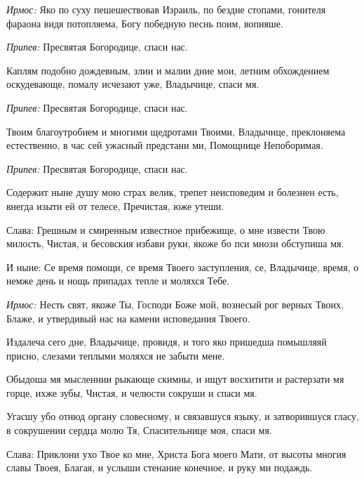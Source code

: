 \begin{mymulticols}
 




{\itshape Ирмос:} Яко по суху пешешествовав Израиль, по бездне стопами, гонителя фараона видя потопляема, Богу победную песнь поим, вопияше. 

{\itshape Припев:} Пресвятая Богородице, спаси нас. 

Каплям подобно дождевным, злии и малии дние мои, летним обхождением оскудевающе, помалу исчезают уже, Владычице, спаси мя. 

{\itshape Припев:} Пресвятая Богородице, спаси нас. 

Твоим благоутробием и многими щедротами Твоими, Владычице, преклоняема естественно, в час сей ужасный предстани ми, Помощнице Непоборимая. 

{\itshape Припев:} Пресвятая Богородице, спаси нас. 

Содержит ныне душу мою страх велик, трепет неисповедим и болезнен есть, внегда изыти ей от телесе, Пречистая, юже утеши. 

Слава: Грешным и смиренным известное прибежище, о мне извести Твою милость, Чистая, и бесовския избави руки, якоже бо пси мнози обступиша мя. 

И ныне: Се время помощи, се время Твоего заступления, се, Владычице, время, о немже день и нощь припадах тепле и моляхся Тебе.




{\itshape Ирмос:} Несть свят, якоже Ты, Господи Боже мой, вознесый рог верных Твоих, Блаже, и утвердивый нас на камени исповедания Твоего. 

Издалеча сего дне, Владычице, провидя, и того яко пришедша помышляяй присно, слезами теплыми моляхся не забыти мене. 

Обыдоша мя мысленнии рыкающе скимны, и ищут восхитити и растерзати мя горце, ихже зубы, Чистая, и челюсти сокруши и спаси мя. 

Угасшу убо отнюд органу словесному, и связавшуся языку, и затворившуся гласу, в сокрушении сердца молю Тя, Спасительнице моя, спаси мя. 

Слава: Приклони ухо Твое ко мне, Христа Бога моего Мати, от высоты многия славы Твоея, Благая, и услыши стенание конечное, и руку ми подаждь. 


\end{mymulticols}
